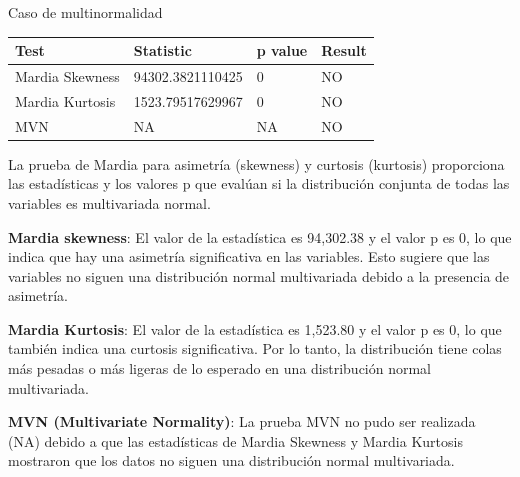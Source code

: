 \documentclass[]{tufte-handout}
\begin{document}
Caso de multinormalidad \vspace{0.3 cm}

\begin{tabular}{llll}
\toprule
Test & Statistic & p value & Result\\
\midrule
Mardia Skewness & 94302.3821110425 & 0 & NO\\
Mardia Kurtosis & 1523.79517629967 & 0 & NO\\
MVN & NA & NA & NO\\
\bottomrule
\end{tabular}
\begin{justify}

La prueba de Mardia para asimetría (skewness) y curtosis (kurtosis) proporciona las estadísticas y los valores p que evalúan si la distribución conjunta de todas las variables es multivariada normal. 

\textbf{Mardia skewness}: El valor de la estadística es 94,302.38 y el valor p es 0, lo que indica que hay una asimetría significativa en las variables. Esto sugiere que las variables no siguen una distribución normal multivariada debido a la presencia de asimetría.

\textbf{Mardia Kurtosis}: El valor de la estadística es 1,523.80 y el valor p es 0, lo que también indica una curtosis significativa. Por lo tanto, la distribución tiene colas más pesadas o más ligeras de lo esperado en una distribución normal multivariada.

\textbf{MVN (Multivariate Normality)}: La prueba MVN no pudo ser realizada (NA) debido a que las estadísticas de Mardia Skewness y Mardia Kurtosis mostraron que los datos no siguen una distribución normal multivariada.
\end{justify}
\end{document}
